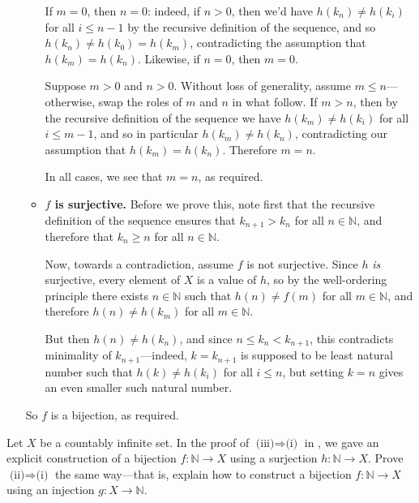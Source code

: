 \begin{cproof}
\begin{itemize}
\begin{itemize}
If $m=0$, then $n=0$: indeed, if $n>0$, then we'd have $h(k_n) \ne h(k_i)$ for all $i \le n-1$ by the recursive definition of the sequence, and so $h(k_n) \ne h(k_0) = h(k_m)$, contradicting the assumption that $h(k_m)=h(k_n)$. Likewise, if $n=0$, then $m=0$.

Suppose $m > 0$ and $n > 0$. Without loss of generality, assume $m \le n$---otherwise, swap the roles of $m$ and $n$ in what follow. If $m>n$, then by the recursive definition of the sequence we have $h(k_m) \ne h(k_i)$ for all $i \le m-1$, and so in particular $h(k_m) \ne h(k_n)$, contradicting our assumption that $h(k_m)=h(k_n)$. Therefore $m=n$.

In all cases, we see that $m=n$, as required.

\item \textbf{$f$ is surjective.} Before we prove this, note first that the recursive definition of the sequence ensures that $k_{n+1} > k_n$ for all $n \in \mathbb{N}$, and therefore that $k_n \ge n$ for all $n \in \mathbb{N}$.

Now, towards a contradiction, assume $f$ is not surjective. Since $h$ \textit{is} surjective, every element of $X$ is a value of $h$, so by the well-ordering principle there exists $n \in \mathbb{N}$ such that $h(n) \ne f(m)$ for all $m \in \mathbb{N}$, and therefore $h(n) \ne h(k_m)$ for all $m \in \mathbb{N}$.

But then $h(n) \ne h(k_n)$, and since $n \le k_n < k_{n+1}$, this contradicts minimality of $k_{n+1}$---indeed, $k=k_{n+1}$ is supposed to be least natural number such that $h(k) \ne h(k_i)$ for all $i \le n$, but setting $k=n$ gives an even smaller such natural number.
\end{itemize}
So $f$ is a bijection, as required.
\end{itemize}
\end{cproof}

\begin{exercise}
Let $X$ be a countably infinite set. In the proof of $\text{(iii)} \Rightarrow \text{(i)}$ in , we gave an explicit construction of a bijection $f : \mathbb{N} \to X$ using a surjection $h : \mathbb{N} \to X$. Prove $\text{(ii)} \Rightarrow \text{(i)}$ the same way---that is, explain how to construct a bijection $f : \mathbb{N} \to X$ using an injection $g : X \to \mathbb{N}$.
\end{exercise}

